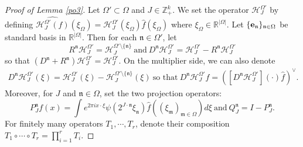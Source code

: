 \documentclass[10pt,a4paper]{amsart}
\numberwithin{equation}{section}
\begin{document}
\begin{proof}[Proof of Lemma \ref{po3}]
	Let $\Omega'\subset \Omega$ and $J\in \mathbb{Z}_+^k$.  We set the operator $ \mathcal{H}^{\Omega'}_J$ by defining $\widehat{\mathcal{H}^{\Omega'}_J(f)}(\xi_{\Omega})=\mathcal{H}^{\Omega'}_{J}(\xi_{\Omega}) \widehat{f}(\xi_{\Omega})$ where $\xi_{\Omega}\in \mathbb{R}^{|\Omega|}$.
	Let $\{ {\bf e}_{\mathfrak{n}}\}_{\mathfrak{n}\in \Omega}$ be standard basis in $\mathbb{R}^{|\Omega|}$. Then for each $\mathfrak{n}\in \Omega'$, let
	$$R^{\mathfrak{n}} \mathcal{H}^{\Omega'}_J = \mathcal{H}_J^{\Omega'\setminus \{\mathfrak{n}\}}\ \text{and}\ D^{\mathfrak{n}}\mathcal{H}^{\Omega'}_J  = \mathcal{H}^{\Omega'}_J- R^{\mathfrak{n}} \mathcal{H}^{\Omega'}_J$$
	so that $ ( D^{\mathfrak{n}}+ R^{\mathfrak{n}}) \mathcal{H}^{\Omega'}_J=\mathcal{H}^{\Omega'}_J.$ 
	On the multiplier side,  we can also denote 
	\begin{align}\label{0bb}
		D^{\mathfrak{n}}\mathcal{H}^{\Omega'}_J (\xi)=\mathcal{H}^{\Omega'}_J (\xi)-\mathcal{H}^{\Omega'\setminus \{\mathfrak{n}\}}_J (\xi)\ \text{so that}\ 
		D^{\mathfrak{n}}\mathcal{H}^{\Omega'}_Jf= \left([D^{\mathfrak{n}}\mathcal{H}^{\Omega'}_J](\cdot)\widehat{f}\right)^{\vee}.\end{align}
	Moreover, for   $J $ and $\mathfrak{n}\in \Omega$, set the two projection operators:
	$$P_J^{\mathfrak{n}}f(x)=\int e^{2\pi i x\cdot \xi} \psi\left(2^{J\cdot \mathfrak{n}} \xi_{\mathfrak{n}} \right) \widehat{f}\left((\xi_{\mathfrak{m}} )_{\mathfrak{m}\in \Omega} \right) d\xi \ \text{and}\    Q_J^{\mathfrak{n}}=I-P_J^{\mathfrak{n}}.$$
	For finitely many operators $T_1,\cdots,T_r$, denote their composition $T_1\circ \cdots \circ T_r= \prod_{i=1}^r T_i $.
	

\end{proof}
\end{document}
